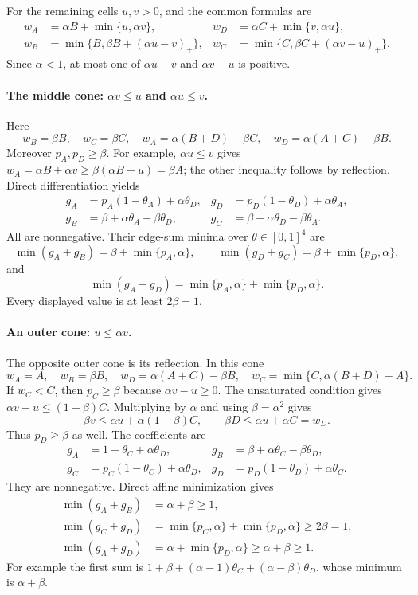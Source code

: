 For the remaining cells $u,v>0$, and the common formulas are
\begin{align*}
 w_A&=\alpha B+\min\{u,\alpha v\},&
 w_D&=\alpha C+\min\{v,\alpha u\},\\
 w_B&=\min\{B,\beta B+(\alpha u-v)_+\},&
 w_C&=\min\{C,\beta C+(\alpha v-u)_+\}.
\end{align*}
Since $\alpha<1$, at most one of $\alpha u-v$ and $\alpha v-u$ is
positive.

\paragraph{The middle cone: $\alpha v\le u$ and $\alpha u\le v$.}
Here
\[
 w_B=\beta B,\quad w_C=\beta C,\quad
 w_A=\alpha(B+D)-\beta C,\quad w_D=\alpha(A+C)-\beta B.
\]
Moreover $p_A,p_D\ge\beta$. For example,
$\alpha u\le v$ gives
$w_A=\alpha B+\alpha v\ge\beta(\alpha B+u)=\beta A$;
the other inequality follows by reflection. Direct differentiation yields
\begin{align*}
 g_A&=p_A(1-\theta_A)+\alpha\theta_D,&
 g_D&=p_D(1-\theta_D)+\alpha\theta_A,\\
 g_B&=\beta+\alpha\theta_A-\beta\theta_D,&
 g_C&=\beta+\alpha\theta_D-\beta\theta_A.
\end{align*}
All are nonnegative. Their edge-sum minima over $\theta\in[0,1]^4$ are
\[
 \min(g_A+g_B)=\beta+\min\{p_A,\alpha\},\qquad
 \min(g_D+g_C)=\beta+\min\{p_D,\alpha\},
\]
and
\[
 \min(g_A+g_D)=\min\{p_A,\alpha\}+\min\{p_D,\alpha\}.
\]
Every displayed value is at least $2\beta=1$.

\paragraph{An outer cone: $u\le\alpha v$.}
The opposite outer cone is its reflection. In this cone
\[
 w_A=A,\quad w_B=\beta B,\quad
 w_D=\alpha(A+C)-\beta B,\quad
 w_C=\min\{C,\alpha(B+D)-A\}.
\]
If $w_C<C$, then $p_C\ge\beta$ because $\alpha v-u\ge0$.
The unsaturated condition gives
$\alpha v-u\le(1-\beta)C$. Multiplying by $\alpha$ and using
$\beta=\alpha^2$ gives
\[
 \beta v\le\alpha u+\alpha(1-\beta)C,
 \qquad \beta D\le\alpha u+\alpha C=w_D.
\]
Thus $p_D\ge\beta$ as well. The coefficients are
\begin{align*}
 g_A&=1-\theta_C+\alpha\theta_D,&
 g_B&=\beta+\alpha\theta_C-\beta\theta_D,\\
 g_C&=p_C(1-\theta_C)+\alpha\theta_D,&
 g_D&=p_D(1-\theta_D)+\alpha\theta_C.
\end{align*}
They are nonnegative. Direct affine minimization gives
\begin{align*}
 \min(g_A+g_B)&=\alpha+\beta\ge1,\\
 \min(g_C+g_D)&=\min\{p_C,\alpha\}+\min\{p_D,\alpha\}\ge2\beta=1,\\
 \min(g_A+g_D)&=\alpha+\min\{p_D,\alpha\}\ge\alpha+\beta\ge1.
\end{align*}
For example the first sum is
$1+\beta+(\alpha-1)\theta_C+(\alpha-\beta)\theta_D$, whose minimum
is $\alpha+\beta$.

